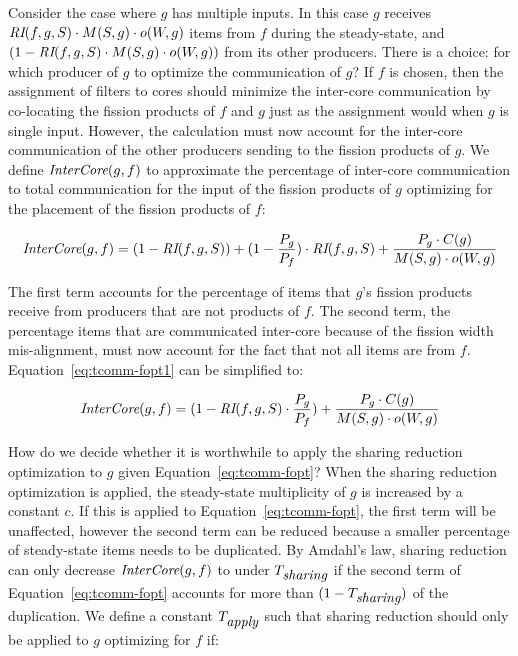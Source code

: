 Consider the case where $g$ has multiple inputs. In this case $g$
receives $\mbox{\it RI}(f, g, S) \cdot M(S, g) \cdot o(W,g)$ items from $f$
during the steady-state, and $(1 -\mbox{\it RI}(f, g, S) \cdot M(S, g) \cdot
o(W,g))$ from its other producers. There is a choice: for which
producer of $g$ to optimize the communication of $g$? If $f$ is
chosen, then the assignment of filters to cores should minimize the
inter-core communication by co-locating the fission products of $f$
and $g$ just as the assignment would when $g$ is single input.
However, the calculation must now account for the inter-core
communication of the other producers sending to the fission products
of $g$. We define $\mbox{\it InterCore}(g, f)$ to approximate the percentage
of inter-core communication to total communication for the input of
the fission products of $g$ optimizing for the placement of the
fission products of $f$:

\begin{equation}
\label{eq:tcomm-fopt1}
 \mt{InterCore}(g,f)   = (1 - \mt{RI}(f,
   g, S))  + (1 - \frac{P_g}{P_f}) \cdot \mt{RI}(f,
   g, S)   + \frac{P_g \cdot C(g)}{M(S, g) \cdot o(W, g)} 
\end{equation}

\noindent The first term accounts for the percentage of items that $g$'s fission
products receive from producers that are not products of $f$.  The
second term, the percentage items that are communicated inter-core
because of the fission width mis-alignment, must now account for the
fact that not all items are from $f$.  Equation~\ref{eq:tcomm-fopt1}
can be simplified to:

\begin{equation}
\label{eq:tcomm-fopt}
 \mt{InterCore}(g, f)   =  (1 -\mt{RI}(f,g, S) \cdot \frac{P_g}{P_f})
 + \frac{P_g \cdot C(g)}{M(S, g) \cdot o(W, g)}
\end{equation}

How do we decide whether it is worthwhile to apply the sharing
reduction optimization to $g$ given Equation~\ref{eq:tcomm-fopt}? When
the sharing reduction optimization is applied, the steady-state
multiplicity of $g$ is increased by a constant $c$.  If this is
applied to Equation~\ref{eq:tcomm-fopt}, the first term will be
unaffected, however the second term can be reduced because a smaller
percentage of steady-state items needs to be duplicated.  By Amdahl's
law, sharing reduction can only decrease $\mbox{\it InterCore}(g,
f)$ to under $T_{\mbox{\it sharing}}$ if the second term of Equation~\ref{eq:tcomm-fopt}
accounts for more than $(1-T_{\mbox{\it sharing}} )$ of the duplication.  We
define a constant $T_{\mbox{\it apply}}$ such that sharing
reduction should only be applied to $g$ optimizing for $f$ if:

